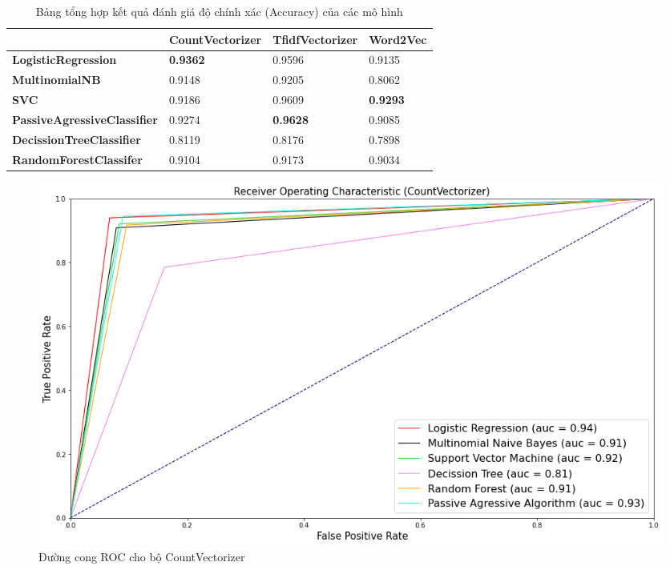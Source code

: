 \documentclass[12pt,a4paper,oneside]{book}
\begin{document}
	\begin{table}[H]
		\renewcommand{\arraystretch}{1.5}
		\small
		\begin{center}
			\begin{tabular}{ | P{12.8em} | P{3.3cm}| P{3cm} | P{2.8cm} |} 
			\hline
		      & \textbf{CountVectorizer} & \textbf{TfidfVectorizer} & \textbf{Word2Vec} \\ 
			\hline
			\textbf{LogisticRegression} & \textbf{0.9362} & 0.9596 & 0.9135 \\ 
			\hline
			\textbf{MultinomialNB} & 0.9148 & 0.9205 & 0.8062 \\
			\hline
			\textbf{SVC} & 0.9186 & 0.9609 & \textbf{0.9293} \\
			\hline
			\textbf{PassiveAgressiveClassifier} & 0.9274 & \textbf{0.9628} & 0.9085 \\
			\hline
			\textbf{DecissionTreeClassifier} & 0.8119 & 0.8176 & 0.7898 \\
			\hline
			\textbf{RandomForestClassifer} & 0.9104 & 0.9173 & 0.9034 \\
			\hline
			\end{tabular}
		\end{center}
		\caption{Bảng tổng hợp kết quả đánh giá độ chính xác (Accuracy) của các mô hình}
	\end{table}
	\hfill
	\begin{figure}[H]
		\centering
		\includegraphics[width=1.03\textwidth]{cvroc}
		\caption{Đường cong ROC cho bộ CountVectorizer}
	\end{figure}
	
\end{document}
